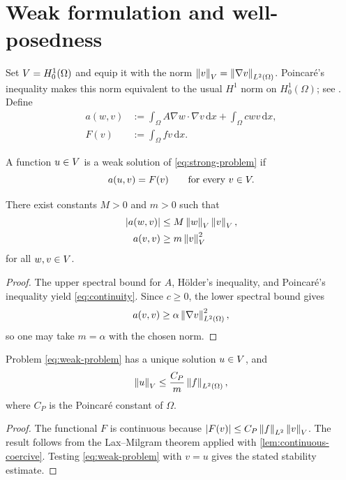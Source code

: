 \section{Weak formulation and well-posedness}
\label{sec:weak-formulation}

Set $V=H_0^1(\Omega)$ and equip it with the norm
$\left\lVert v \right\rVert_{V}=\left\lVert \nabla v \right\rVert_{L^2(\Omega)}$. Poincar\'e's inequality makes
this norm equivalent to the usual $H^1$ norm on $H_0^1(\Omega)$; see
\cite[Chapter~5]{evans2010}. Define
\begin{align}
  a(w,v)
  &:=\int_\Omega A\nabla w\cdot\nabla v\,\mathrm dx
     +\int_\Omega cwv\,\mathrm dx,
  \label{eq:bilinear-form}\\
  F(v)
  &:=\int_\Omega fv\,\mathrm dx.
  \label{eq:load-functional}
\end{align}

\begin{definition}
  A function $u\in V$ is a weak solution of \cref{eq:strong-problem} if
  \begin{equation}
    a(u,v)=F(v)
    \qquad\text{for every }v\in V.
    \label{eq:weak-problem}
  \end{equation}
\end{definition}

\begin{lemma}
\label{lem:continuous-coercive}
There exist constants $M>0$ and $m>0$ such that
\begin{align}
  \lvert a(w,v)\rvert
  &\leq M\left\lVert w \right\rVert_{V}\left\lVert v \right\rVert_{V},
  \label{eq:continuity}\\
  a(v,v)
  &\geq m\left\lVert v \right\rVert_{V}^2
  \label{eq:coercivity}
\end{align}
for all $w,v\in V$.
\end{lemma}

\begin{proof}
The upper spectral bound for $A$, H\"older's inequality, and Poincar\'e's
inequality yield \cref{eq:continuity}. Since $c\geq0$, the lower spectral
bound gives
\[
  a(v,v)\geq\alpha\left\lVert \nabla v \right\rVert_{L^2(\Omega)}^2,
\]
so one may take $m=\alpha$ with the chosen norm.
\end{proof}

\begin{theorem}
\label{thm:lax-milgram}
Problem \cref{eq:weak-problem} has a unique solution $u\in V$, and
\begin{equation}
  \left\lVert u \right\rVert_{V}\leq \frac{C_P}{m}\left\lVert f \right\rVert_{L^2(\Omega)},
  \label{eq:stability-bound}
\end{equation}
where $C_P$ is the Poincar\'e constant of $\Omega$.
\end{theorem}

\begin{proof}
The functional $F$ is continuous because
$\lvert F(v)\rvert\leq C_P\left\lVert f \right\rVert_{L^2}\left\lVert v \right\rVert_{V}$. The result follows
from the Lax--Milgram theorem applied with
\cref{lem:continuous-coercive}. Testing \cref{eq:weak-problem} with $v=u$
gives the stated stability estimate.
\end{proof}
